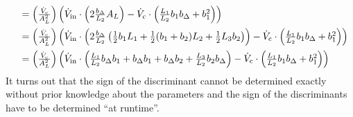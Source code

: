 \begin{equation}
\begin{array}{lll}
    \\\addlinespace
    &=   \left( \frac{\Vc}{\AL^2} \right)     
      \left(       
      \Vin  \cdot  \left(
      2 \frac{\bDelta}{L_2} \AL
      \right)
      - \Vc
      \cdot \left(      
      \frac{L_1}{L_2}  b_1\bDelta        
      + b_1^2                   
      \right)     
      \right)      
    \\\addlinespace
    &=
      \left( \frac{\Vc}{\AL^2} \right)     
      \left(       
      \Vin  \cdot  \left(
      2 \frac{\bDelta}{L_2}
      \left(
      \frac{1}{2} b_1  L_1 
      +  \frac{1}{2} (b_1 + b_2) L_2 
      + \frac{1}{2} L_3b_2        
      \right)      
      \right)
      - \Vc
      \cdot \left(      
      \frac{L_1}{L_2}  b_1\bDelta        
      + b_1^2                   
      \right)     
      \right)
    \\\addlinespace
    &=
      \left( \frac{\Vc}{\AL^2} \right)     
      \left(       
      \Vin  \cdot  \left(
      \frac{L_1 }{L_2} \bDelta b_1
      + \bDelta b_1
      + \bDelta b_2
      + \frac{L_3}{L_2} b_2 \bDelta
      \right)          
      - \Vc
      \cdot \left(      
      \frac{L_1}{L_2}  b_1\bDelta        
      + b_1^2                   
      \right)
      \right)
  \end{array}
\end{equation}
It turns out that the sign of the discriminant cannot be determined exactly without prior knowledge about the 
parameters and the sign of the discriminants have to be determined ``at runtime''.\clearpage
